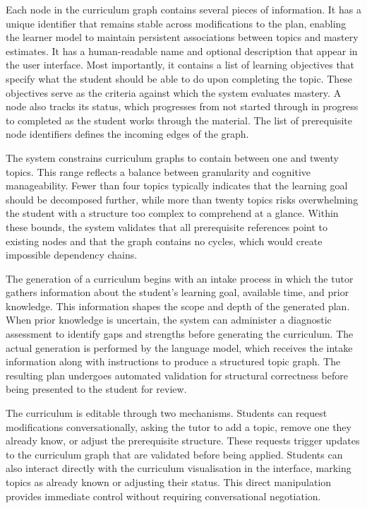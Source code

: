 \documentclass[logo,bsc,singlespacing,parskip,online]{infthesis}
\begin{document}
Each node in the curriculum graph contains several pieces of information. It has a unique identifier that remains stable across modifications to the plan, enabling the learner model to maintain persistent associations between topics and mastery estimates. It has a human-readable name and optional description that appear in the user interface. Most importantly, it contains a list of learning objectives that specify what the student should be able to do upon completing the topic. These objectives serve as the criteria against which the system evaluates mastery. A node also tracks its status, which progresses from not started through in progress to completed as the student works through the material. The list of prerequisite node identifiers defines the incoming edges of the graph.

The system constrains curriculum graphs to contain between one and twenty topics. This range reflects a balance between granularity and cognitive manageability. Fewer than four topics typically indicates that the learning goal should be decomposed further, while more than twenty topics risks overwhelming the student with a structure too complex to comprehend at a glance. Within these bounds, the system validates that all prerequisite references point to existing nodes and that the graph contains no cycles, which would create impossible dependency chains.

The generation of a curriculum begins with an intake process in which the tutor gathers information about the student's learning goal, available time, and prior knowledge. This information shapes the scope and depth of the generated plan. When prior knowledge is uncertain, the system can administer a diagnostic assessment to identify gaps and strengths before generating the curriculum. The actual generation is performed by the language model, which receives the intake information along with instructions to produce a structured topic graph. The resulting plan undergoes automated validation for structural correctness before being presented to the student for review.

The curriculum is editable through two mechanisms. Students can request modifications conversationally, asking the tutor to add a topic, remove one they already know, or adjust the prerequisite structure. These requests trigger updates to the curriculum graph that are validated before being applied. Students can also interact directly with the curriculum visualisation in the interface, marking topics as already known or adjusting their status. This direct manipulation provides immediate control without requiring conversational negotiation.
\end{document}
